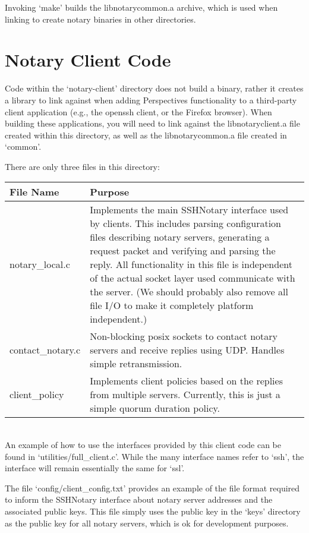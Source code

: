 \documentclass[pdftex,singlecolumn,11pt,letterpaper]{article}
\newcommand{\name}{Perspectives\xspace}
\begin{document}
Invoking `make' builds the libnotarycommon.a archive, which is used when 
linking to create notary binaries in other directories.  

\section{Notary Client Code}

Code within the `notary-client' directory does not build a binary, rather
it creates a library to link against when adding \name functionality to 
a third-party client application (e.g., the openssh client, or the Firefox
browser).  When building these applications, you will need to link against
the libnotaryclient.a file created within this directory, as well as the 
libnotarycommon.a file created in `common'.  

There are only three files in this directory:\\

\begin{tabular*}{1.1\textwidth}{ @{\extracolsep{\fill}} | p{3cm} | p{10cm} | }
\hline 
\textbf{File Name}  & \textbf{Purpose} \\
\hline 
notary\_local.c & Implements the main SSHNotary interface used by clients.
This includes parsing configuration files describing notary servers, 
generating a request packet and verifying and parsing the reply.  All
functionality in this file is independent of the actual socket layer 
used communicate with the server. (We should probably also remove all 
file I/O to make it completely platform independent.) \\

contact\_notary.c &  Non-blocking posix sockets to contact notary servers and
receive replies using UDP.  Handles simple retransmission. \\

client\_policy & Implements client policies based on the replies from multiple
servers.  Currently, this is just a simple quorum duration policy.  \\
   
\hline
\end{tabular*} \\

An example of how to use the interfaces provided by this client code can be
found in `utilities/full\_client.c'.  While the many interface names refer to
`ssh', the interface will remain essentially the same for `ssl'.  

The file `config/client\_config.txt' 
provides an example of the file format required
to inform the SSHNotary interface about notary server addresses and the
associated public keys.  This file simply uses the public key in the `keys'
directory as the public key for all notary servers, which is ok for 
development purposes.  
\end{document}
